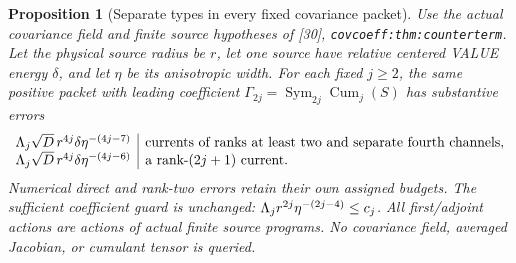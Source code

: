 \documentclass[11pt]{article}
\numberwithin{equation}{section}
\newtheorem{proposition}[theorem]{Proposition}
\theoremstyle{remark}\newtheorem{remark}[theorem]{Remark}
\newcommand{\Sym}{\operatorname{Sym}}\newcommand{\HS}{\mathrm{HS}}
\newcommand{\src}[1]{\texttt{\nolinkurl{#1}}}
\begin{document}
\begin{proposition}[Separate types in every fixed covariance packet]
\label{prop:covariance-packet-types}
Use the actual covariance field and finite source hypotheses of [30],
\src{covcoeff:thm:counterterm}. Let the physical source radius be $r$,
let one source have relative centered VALUE energy $\delta$, and let
$\eta$ be its anisotropic width. For each fixed $j\ge2$, the same
positive packet with leading coefficient
$\Gamma_{2j}=\Sym_{2j}\operatorname{Cum}_j(S)$ has substantive errors
\begin{equation}\label{eq:covariance-packet-types}
\begin{array}{c|l}
 \Lambda_j\sqrt D\,r^{4j}\delta\eta^{-(4j-7)}
   &\text{currents of ranks at least two and separate fourth channels},\\
 \Lambda_j\sqrt D\,r^{4j}\delta\eta^{-(4j-6)}
   &\text{a rank-$(2j+1)$ current}.
\end{array}
\end{equation}
Numerical direct and rank-two errors retain their own assigned budgets.
The sufficient coefficient guard is unchanged:
$\Lambda_jr^{2j}\eta^{-(2j-4)}\le c_j$.
All first/adjoint actions are actions of actual finite source programs.
No covariance field, averaged Jacobian, or cumulant tensor is queried.
\end{proposition}
\end{document}
